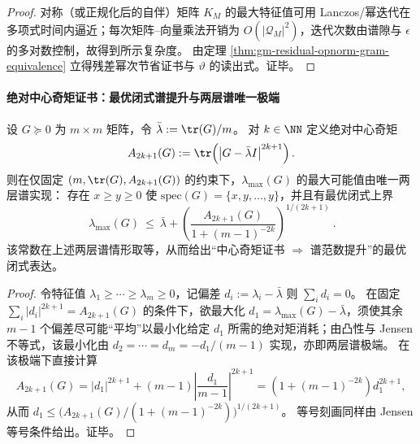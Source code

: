 \begin{proof}
对称（或正规化后的自伴）矩阵 \(K_M\) 的最大特征值可用 Lanczos/幂迭代在多项式时间内逼近；每次矩阵--向量乘法开销为 \(O(|\mathcal{Q}_M|^2)\)，迭代次数由谱隙与 \(\epsilon\) 的多对数控制，故得到所示复杂度。
由定理 \ref{thm:gm-residual-opnorm-gram-equivalence} 立得残差幂次节省证书与 \(\vartheta\) 的读出式。证毕。
\end{proof}

\paragraph{绝对中心奇矩证书：最优闭式谱提升与两层谱唯一极端}
\begin{theorem}\label{thm:gm-abs-centered-odd-moment-extremal}
设 \(G\succeq 0\) 为 \(m\times m\) 矩阵，令 \(\bar\lambda:=\tr(G)/m\)。
对 \(k\in\NN\) 定义绝对中心奇矩
\[
A_{2k+1}(G):=\tr\!\left(\left|G-\bar\lambda I\right|^{2k+1}\right).
\]
则在仅固定 \((m,\tr(G),A_{2k+1}(G))\) 的约束下，\(\lambda_{\max}(G)\) 的最大可能值由唯一两层谱实现：
存在 \(x\ge y\ge 0\) 使 \(\mathrm{spec}(G)=\{x,y,\dots,y\}\)，并且有最优闭式上界
\[
\boxed{\ 
\lambda_{\max}(G)\ \le\ \bar\lambda+\left(\frac{A_{2k+1}(G)}{1+(m-1)^{-2k}}\right)^{\!1/(2k+1)}
\ }.
\]
该常数在上述两层谱情形取等，从而给出“中心奇矩证书 \(\Rightarrow\) 谱范数提升”的最优闭式表达。
\end{theorem}

\begin{proof}
令特征值 \(\lambda_1\ge\cdots\ge\lambda_m\ge 0\)，记偏差 \(d_i:=\lambda_i-\bar\lambda\) 则 \(\sum_i d_i=0\)。
在固定 \(\sum_i|d_i|^{2k+1}=A_{2k+1}(G)\) 的条件下，欲最大化 \(d_1=\lambda_{\max}(G)-\bar\lambda\)，须使其余 \(m-1\) 个偏差尽可能“平均”以最小化给定 \(d_1\) 所需的绝对矩消耗；由凸性与 Jensen 不等式，该最小化由
\(
d_2=\cdots=d_m=-d_1/(m-1)
\)
实现，亦即两层谱极端。
在该极端下直接计算
\[
A_{2k+1}(G)
=|d_1|^{2k+1}+(m-1)\left|\frac{d_1}{m-1}\right|^{2k+1}
=\left(1+(m-1)^{-2k}\right)d_1^{2k+1},
\]
从而 \(d_1\le \bigl(A_{2k+1}(G)/(1+(m-1)^{-2k})\bigr)^{1/(2k+1)}\)。
等号刻画同样由 Jensen 等号条件给出。证毕。
\end{proof}

